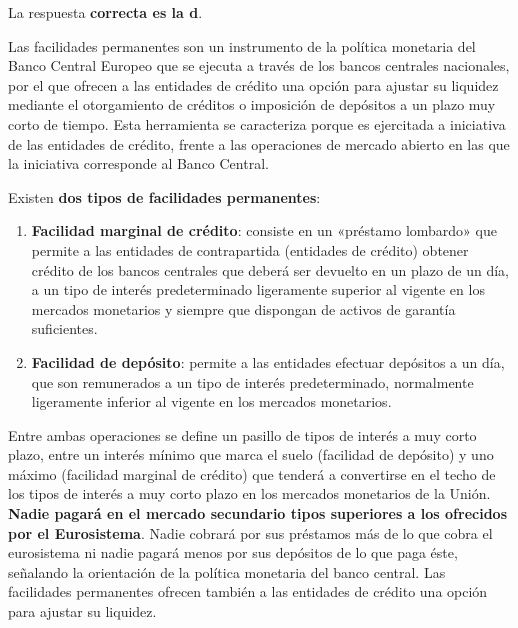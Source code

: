 \documentclass[
  letterpaper,
  DIV=11,
  numbers=noendperiod]{scrreprt}
\begin{document}
\begin{tcolorbox}[enhanced jigsaw, left=2mm, opacityback=0, colback=white, breakable, arc=.35mm, bottomrule=.15mm, rightrule=.15mm, toprule=.15mm, leftrule=.75mm, colframe=quarto-callout-tip-color-frame]
\begin{minipage}[t]{5.5mm}
\textcolor{quarto-callout-tip-color}{\faLightbulb}
\end{minipage}%
\begin{minipage}[t]{\textwidth - 5.5mm}

La respuesta \textbf{correcta es la d}.

Las facilidades permanentes son un instrumento de la política monetaria
del Banco Central Europeo que se ejecuta a través de los bancos
centrales nacionales, por el que ofrecen a las entidades de crédito una
opción para ajustar su liquidez mediante el otorgamiento de créditos o
imposición de depósitos a un plazo muy corto de tiempo. Esta herramienta
se caracteriza porque es ejercitada a iniciativa de las entidades de
crédito, frente a las operaciones de mercado abierto en las que la
iniciativa corresponde al Banco Central.

Existen \textbf{dos tipos de facilidades permanentes}:

\begin{enumerate}
\def\labelenumi{\arabic{enumi}.}
\item
  \textbf{Facilidad marginal de crédito}: consiste en un «préstamo
  lombardo» que permite a las entidades de contrapartida (entidades de
  crédito) obtener crédito de los bancos centrales que deberá ser
  devuelto en un plazo de un día, a un tipo de interés predeterminado
  ligeramente superior al vigente en los mercados monetarios y siempre
  que dispongan de activos de garantía suficientes.
\item
  \textbf{Facilidad de depósito}: permite a las entidades efectuar
  depósitos a un día, que son remunerados a un tipo de interés
  predeterminado, normalmente ligeramente inferior al vigente en los
  mercados monetarios.
\end{enumerate}

Entre ambas operaciones se define un pasillo de tipos de interés a muy
corto plazo, entre un interés mínimo que marca el suelo (facilidad de
depósito) y uno máximo (facilidad marginal de crédito) que tenderá a
convertirse en el techo de los tipos de interés a muy corto plazo en los
mercados monetarios de la Unión. \textbf{Nadie pagará en el mercado
secundario tipos superiores a los ofrecidos por el Eurosistema}. Nadie
cobrará por sus préstamos más de lo que cobra el eurosistema ni nadie
pagará menos por sus depósitos de lo que paga éste, señalando la
orientación de la política monetaria del banco central. Las facilidades
permanentes ofrecen también a las entidades de crédito una opción para
ajustar su liquidez.


\end{minipage}
\end{tcolorbox}
\end{document}
